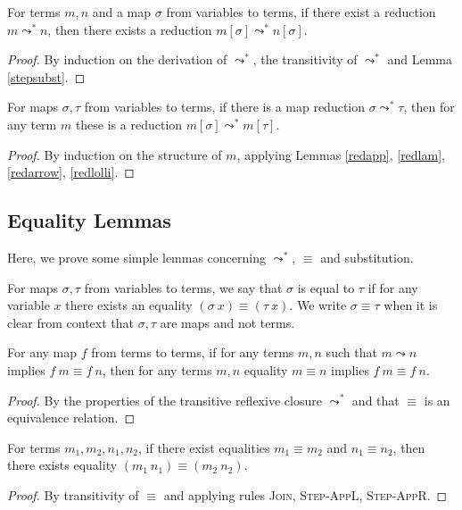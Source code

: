 \documentclass[sigplan,screen,review,anonymous]{acmart}
\newcommand{\rname}[1]{\textsc{\footnotesize #1}}
\newcommand{\step}{\leadsto}
\newcommand{\red}{\leadsto^*}
\begin{document}
\begin{lemma}\label{redsubst}
  For terms $m, n$ and a map $\sigma$ from variables to terms, if there exist a reduction $m \red n$, then there exists a reduction $m[\sigma] \red n[\sigma]$.
\end{lemma}
\begin{proof}
  By induction on the derivation of $\red$, the transitivity of $\red$ and Lemma \ref{stepsubst}.
\end{proof}

\begin{lemma}\label{redcompat}
  For maps $\sigma, \tau$ from variables to terms, if there is a map reduction $\sigma \red \tau$, then for any term $m$ these is a reduction $m[\sigma] \red m[\tau]$.
\end{lemma}
\begin{proof}
  By induction on the structure of $m$, applying Lemmas \ref{redapp}, \ref{redlam}, \ref{redarrow}, \ref{redlolli}.
\end{proof}

\subsection{Equality Lemmas}
Here, we prove some simple lemmas concerning $\red$, $\equiv$ and substitution.

\begin{definition}
  For maps $\sigma, \tau$ from variables to terms, we say that $\sigma$ is equal to $\tau$ if for any variable $x$ there exists an equality $(\sigma\ x) \equiv (\tau\ x)$. We write $\sigma \equiv \tau$ when it is clear from context that $\sigma, \tau$ are maps and not terms.
\end{definition}

\begin{lemma}\label{convhom}
  For any map $f$ from terms to terms, if for any terms $m, n$ such that $m \step n$ implies $f\ m \equiv f\ n$, then for any terms $m, n$ equality $m \equiv n$ implies $f\ m \equiv f\ n$.
\end{lemma}
\begin{proof}
  By the properties of the transitive reflexive closure $\red$ and that $\equiv$ is an equivalence relation.
\end{proof}

\begin{lemma}\label{convapp}
  For terms $m_1, m_2, n_1, n_2$, if there exist equalities $m_1 \equiv m_2$ and $n_1 \equiv n_2$, then there exists equality $(m_1\ n_1) \equiv (m_2\ n_2)$.
\end{lemma}
\begin{proof}
  By transitivity of $\equiv$ and applying rules \rname{Join}, \rname{Step-AppL}, \rname{Step-AppR}.
\end{proof}
\end{document}
